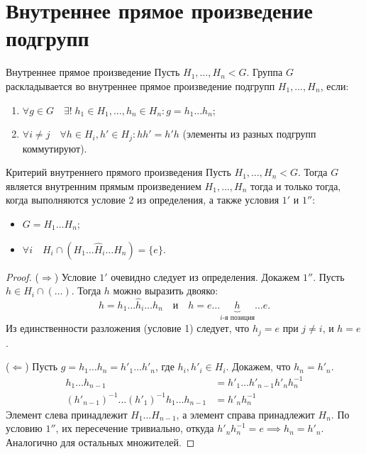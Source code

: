 
\section{Внутреннее прямое произведение подгрупп}

\begin{Definition}{Внутреннее прямое произведение}{}
	Пусть $H_1, \dots, H_n < G$. Группа $G$ раскладывается во внутреннее прямое произведение подгрупп $H_1, \dots, H_n$, если:
	\begin{enumerate}
		\item $\forall g \in G \quad \exists! \; h_1 \in H_1, \dots, h_n \in H_n \colon g = h_1 \dots h_n$;
		\item $\forall i \neq j \quad \forall h \in H_i, h' \in H_j \colon hh' = h'h$ (элементы из разных подгрупп коммутируют).
	\end{enumerate}
\end{Definition}

\begin{Proposition}{Критерий внутреннего прямого произведения}{}
	Пусть $H_1, \dots, H_n < G$. Тогда $G$ является внутренним прямым произведением $H_1, \dots, H_n$ тогда и только тогда, когда выполняются условие 2 из определения, а также условия $1'$ и $1''$:
	\begin{itemize}
		\item[$1'$)] $G = H_1 \dots H_n$;
		\item[$1''$)] $\forall i \quad H_i \cap (H_1 \dots \widehat{H}_i \dots H_n) = \{e\}$.
	\end{itemize}
\end{Proposition}

\begin{proof}
	($\Rightarrow$) Условие $1'$ очевидно следует из определения.
	Докажем $1''$. Пусть $h \in H_i \cap (\dots)$. Тогда $h$ можно выразить двояко:
	\[
	h = h_1 \dots \widehat{h}_i \dots h_n \quad \text{и} \quad h = e \dots \underbrace{h}_{i\text{-я позиция}} \dots e.
	\]
	Из единственности разложения (условие 1) следует, что $h_j = e$ при $j \neq i$, и $h = e$.

	($\Leftarrow$) Пусть $g = h_1 \dots h_n = h'_1 \dots h'_n$, где $h_i, h'_i \in H_i$. Докажем, что $h_n = h'_n$.
	\begin{align*}
		h_1 \dots h_{n-1} &= h'_1 \dots h'_{n-1} h'_n h_n^{-1} \\
		(h'_{n-1})^{-1} \dots (h'_1)^{-1} h_1 \dots h_{n-1} &= h'_n h_n^{-1}
	\end{align*}
	Элемент слева принадлежит $H_1 \dots H_{n-1}$, а элемент справа принадлежит $H_n$. По условию $1''$, их пересечение тривиально, откуда $h'_n h_n^{-1} = e \implies h_n = h'_n$. Аналогично для остальных множителей.
\end{proof}

